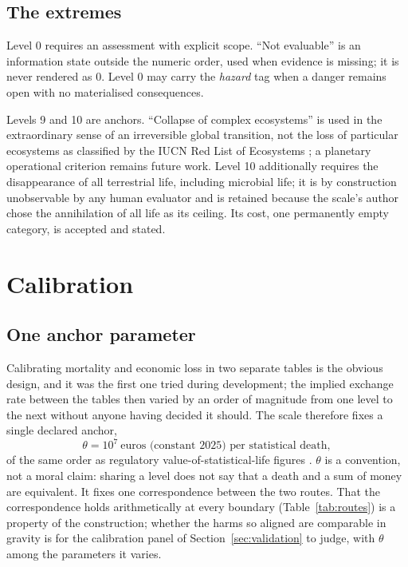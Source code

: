 \documentclass[11pt,a4paper]{article}
\begin{document}
\subsection{The extremes}
\label{sec:extremes}

Level 0 requires an assessment with explicit scope. ``Not evaluable'' is an information state outside the numeric order, used when evidence is missing; it is never rendered as 0. Level 0 may carry the \emph{hazard} tag when a danger remains open with no materialised consequences.

Levels 9 and 10 are anchors. ``Collapse of complex ecosystems'' is used in the extraordinary sense of an irreversible global transition, not the loss of particular ecosystems as classified by the IUCN Red List of Ecosystems \citep{keith2013}; a planetary operational criterion remains future work. Level 10 additionally requires the disappearance of all terrestrial life, including microbial life; it is by construction unobservable by any human evaluator and is retained because the scale's author chose the annihilation of all life as its ceiling. Its cost, one permanently empty category, is accepted and stated.

\section{Calibration}
\label{sec:calibration}

\subsection{One anchor parameter}

Calibrating mortality and economic loss in two separate tables is the obvious design, and it was the first one tried during development; the implied exchange rate between the tables then varied by an order of magnitude from one level to the next without anyone having decided it should. The scale therefore fixes a single declared anchor,
\begin{equation}
\theta = 10^{7}\ \text{euros (constant 2025) per statistical death},
\end{equation}
of the same order as regulatory value-of-statistical-life figures \citep{viscusi2003vsl,usdot2025vsl}. $\theta$ is a convention, not a moral claim: sharing a level does not say that a death and a sum of money are equivalent. It fixes one correspondence between the two routes. That the correspondence holds arithmetically at every boundary (Table~\ref{tab:routes}) is a property of the construction; whether the harms so aligned are comparable in gravity is for the calibration panel of Section~\ref{sec:validation} to judge, with $\theta$ among the parameters it varies.
\end{document}
